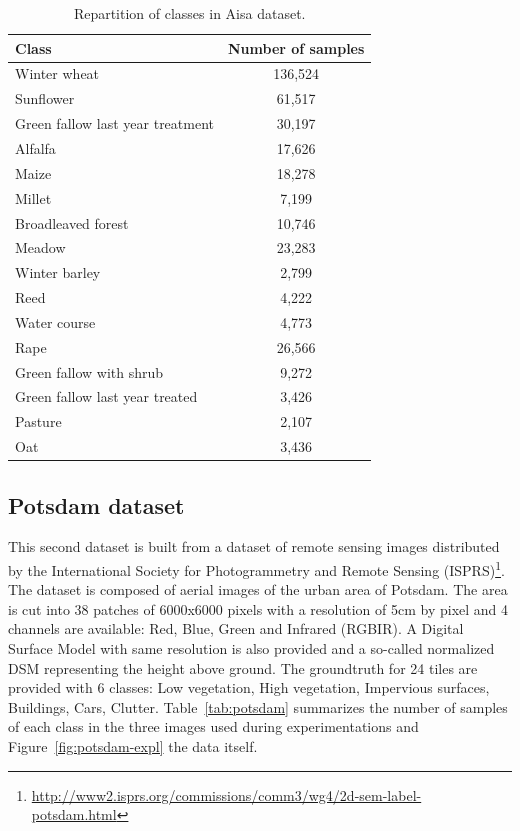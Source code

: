 \documentclass[journal,peerreview,onecolumn]{IEEEtran}
\begin{document}
    \begin{table}[!t]
        \centering
        \caption{Repartition of classes in Aisa dataset.\label{tab:aisa}}
        \begin{tabular}[b]{lc}\hline
          Class & Number of samples \\ \hline
          Winter wheat & 136,524 \\
          Sunflower & 61,517 \\
          Green fallow last year treatment & 30,197 \\
          Alfalfa & 17,626 \\
          Maize & 18,278 \\
          Millet & 7,199 \\
          Broadleaved forest & 10,746 \\
          Meadow & 23,283 \\
          Winter barley & 2,799 \\
          Reed & 4,222 \\
          Water course & 4,773 \\
          Rape & 26,566 \\
          Green fallow with shrub & 9,272 \\
          Green fallow last year treated & 3,426 \\
          Pasture & 2,107 \\
          Oat & 3,436 \\ \hline
        \end{tabular}
    \end{table}

    \subsection{Potsdam dataset}
    \label{sec:pots-dataset}

    This second dataset is built from a dataset of remote sensing images distributed by the International Society for Photogrammetry and Remote Sensing (ISPRS)\footnote{\url{http://www2.isprs.org/commissions/comm3/wg4/2d-sem-label-potsdam.html}}. The dataset is composed of aerial images of the urban area of Potsdam. The area is cut into 38 patches of 6000x6000 pixels with a resolution of 5cm by pixel and 4 channels are available: Red, Blue, Green and Infrared (RGBIR). A Digital Surface Model with same resolution is also provided and a so-called normalized DSM representing the height above ground. The groundtruth for 24 tiles are provided with 6 classes: Low vegetation, High vegetation, Impervious surfaces, Buildings, Cars, Clutter. Table~\ref{tab:potsdam} summarizes the number of samples of each class in the three images used during experimentations and Figure~\ref{fig:potsdam-expl} the data itself.
\end{document}
